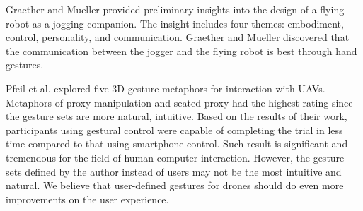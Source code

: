 \documentclass{sigchi}
\begin{document}
Graether and Mueller \cite{Graether:2012:JFR:2212776.2212386} provided preliminary insights into the design of a flying robot as a jogging companion. The insight includes four themes: embodiment, control, personality, and communication. Graether and Mueller discovered that the communication between the jogger and the flying robot is best through hand gestures.

Pfeil et al. \cite{Pfeil:2013:EGM:2449396.2449429} explored five 3D gesture metaphors for interaction with UAVs. Metaphors of proxy manipulation and seated proxy had the highest rating since the gesture sets are more natural, intuitive. Based on the results of their work, participants using gestural control were capable of completing the trial in less time compared to that using smartphone control. Such result is significant and tremendous for the field of human-computer interaction. However, the gesture sets defined by the author instead of users may not be the most intuitive and natural. We believe that user-defined gestures for drones should do even more improvements on the user experience.



\end{document}
